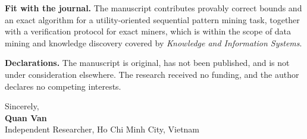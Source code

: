 \documentclass[11pt,a4paper]{article}
\newcommand{\journal}{Knowledge and Information Systems}
\begin{document}
\textbf{Fit with the journal.} The manuscript contributes provably correct bounds and an exact algorithm for a utility-oriented sequential pattern mining task, together with a verification protocol for exact miners, which is within the scope of data mining and knowledge discovery covered by \textit{\journal}.

\textbf{Declarations.} The manuscript is original, has not been published, and is not under consideration elsewhere. The research received no funding, and the author declares no competing interests.

Sincerely, \\[0.3em]
\textbf{Quan Van} \\
Independent Researcher, Ho Chi Minh City, Vietnam
\end{document}
